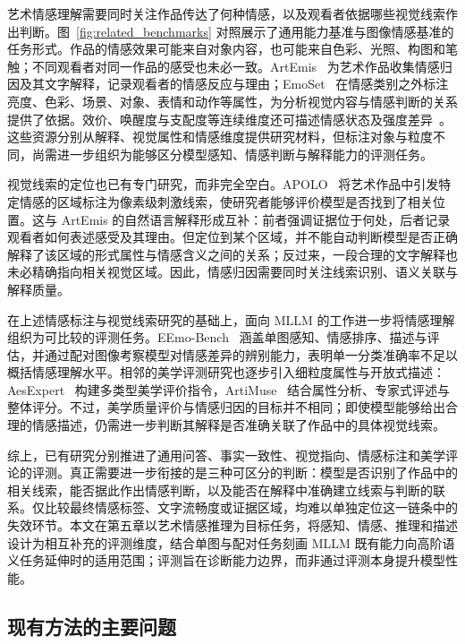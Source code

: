 艺术情感理解需要同时关注作品传达了何种情感，以及观看者依据哪些视觉线索作出判断。图~\ref{fig:related_benchmarks} 对照展示了通用能力基准与图像情感基准的任务形式。作品的情感效果可能来自对象内容，也可能来自色彩、光照、构图和笔触；不同观看者对同一作品的感受也未必一致。ArtEmis~\cite{achlioptas2021artemis} 为艺术作品收集情感归因及其文字解释，记录观看者的情感反应与理由；EmoSet~\cite{yang2023emoset} 在情感类别之外标注亮度、色彩、场景、对象、表情和动作等属性，为分析视觉内容与情感判断的关系提供了依据。效价、唤醒度与支配度等连续维度还可描述情感状态及强度差异~\cite{you2016building}。这些资源分别从解释、视觉属性和情感维度提供研究材料，但标注对象与粒度不同，尚需进一步组织为能够区分模型感知、情感判断与解释能力的评测任务。

视觉线索的定位也已有专门研究，而非完全空白。APOLO~\cite{chen2024stimuli} 将艺术作品中引发特定情感的区域标注为像素级刺激线索，使研究者能够评价模型是否找到了相关位置。这与 ArtEmis 的自然语言解释形成互补：前者强调证据位于何处，后者记录观看者如何表述感受及其理由。但定位到某个区域，并不能自动判断模型是否正确解释了该区域的形式属性与情感含义之间的关系；反过来，一段合理的文字解释也未必精确指向相关视觉区域。因此，情感归因需要同时关注线索识别、语义关联与解释质量。

在上述情感标注与视觉线索研究的基础上，面向 MLLM 的工作进一步将情感理解组织为可比较的评测任务。EEmo-Bench~\cite{eemobench2025} 涵盖单图感知、情感排序、描述与评估，并通过配对图像考察模型对情感差异的辨别能力，表明单一分类准确率不足以概括情感理解水平。相邻的美学评测研究也逐步引入细粒度属性与开放式描述：AesExpert~\cite{aesexpert2024} 构建多类型美学评价指令，ArtiMuse~\cite{cao2025artimuse} 结合属性分析、专家式评述与整体评分。不过，美学质量评价与情感归因的目标并不相同；即使模型能够给出合理的情感描述，仍需进一步判断其解释是否准确关联了作品中的具体视觉线索。

综上，已有研究分别推进了通用问答、事实一致性、视觉指向、情感标注和美学评论的评测。真正需要进一步衔接的是三种可区分的判断：模型是否识别了作品中的相关线索，能否据此作出情感判断，以及能否在解释中准确建立线索与判断的联系。仅比较最终情感标签、文字流畅度或证据区域，均难以单独定位这一链条中的失效环节。本文在第五章以艺术情感推理为目标任务，将感知、情感、推理和描述设计为相互补充的评测维度，结合单图与配对任务刻画 MLLM 既有能力向高阶语义任务延伸时的适用范围；评测旨在诊断能力边界，而非通过评测本身提升模型性能。

\subsection{现有方法的主要问题}

